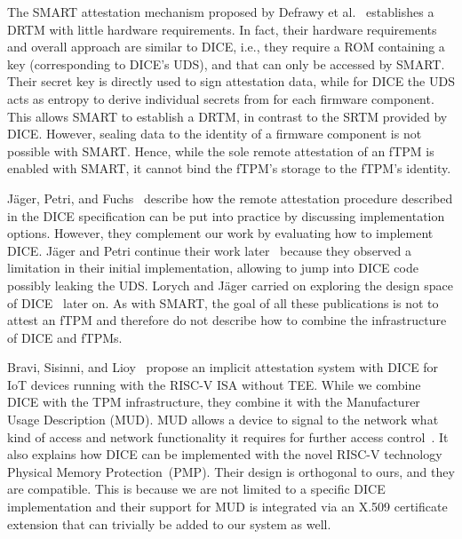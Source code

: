 

The SMART attestation mechanism proposed by Defrawy et al.~\cite{EURECOM+3536} establishes a \ac{DRTM} with little hardware requirements.
In fact, their hardware requirements and overall approach are similar to \ac{DICE}, i.e., they require a ROM containing a key (corresponding to DICE's \ac{UDS}), and that can only be accessed by SMART\@.
Their secret key is directly used to sign attestation data, while for \ac{DICE} the \ac{UDS} acts as entropy to derive individual secrets from for each firmware component.
This allows SMART to establish a \ac{DRTM}, in contrast to the \ac{SRTM} provided by \ac{DICE}.
However, sealing data to the identity of a firmware component is not possible with SMART\@.
Hence, while the sole remote attestation of an \ac{fTPM} is enabled with SMART, it cannot bind the fTPM's storage to the fTPM's identity.


Jäger, Petri, and Fuchs~\cite{Jaeger2017} describe how the remote attestation procedure described in the DICE specification can be put into practice by discussing implementation options.
However, they complement our work by evaluating how to implement \ac{DICE}\@.
Jäger and Petri continue their work later~\cite{Jaeger2020} because they observed a limitation in their initial implementation, allowing to jump into \ac{DICE} code possibly leaking the \ac{UDS}.
Lorych and Jäger carried on exploring the design space of DICE~\cite{Lorych2022} later on.
As with SMART, the goal of all these publications is not to attest an \ac{fTPM} and therefore do not describe how to combine the infrastructure of DICE and \acp{fTPM}.

Bravi, Sisinni, and Lioy~\cite{Bravi2023} propose an implicit attestation system with DICE for IoT devices running with the RISC-V ISA without TEE\@.
While we combine DICE with the TPM infrastructure, they combine it with the Manufacturer Usage Description (MUD).
MUD allows a device to signal to the network what kind of access and network functionality it requires for further access control~\cite{Lear2019}.
It also explains how DICE can be implemented with the novel RISC-V technology Physical Memory Protection~(PMP).
Their design is orthogonal to ours, and they are compatible.
This is because we are not limited to a specific DICE implementation and their support for MUD is integrated via an X.509 certificate extension that can trivially be added to our system as well.

